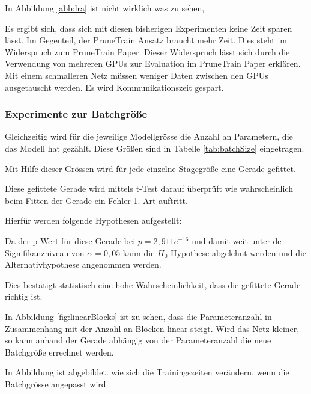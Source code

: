  In Abbildung \ref{abb:lra} ist nicht wirklich was zu sehen, 
 
 
 
Es ergibt sich, dass sich mit diesen bisherigen Experimenten keine Zeit sparen lässt. Im Gegenteil, der PruneTrain Ansatz braucht mehr Zeit. Dies steht im Widerspruch zum PruneTrain Paper. Dieser Widerspruch lässt sich durch die Verwendung von mehreren GPUs zur Evaluation im PruneTrain Paper erklären. Mit einem schmalleren Netz müssen weniger Daten zwischen den GPUs ausgetauscht werden. Es wird Kommunikationszeit gespart.




\color{blue1}

\subsubsection{Experimente zur Batchgröße}



Gleichzeitig wird für die jeweilige Modellgrösse die Anzahl an Parametern, die das Modell hat gezählt. Diese Größen sind in Tabelle \ref{tab:batchSize} eingetragen. 


Mit Hilfe dieser Grössen wird für jede einzelne Stagegröße eine Gerade gefittet.

Diese gefittete Gerade wird mittels t-Test darauf überprüft wie wahrscheinlich beim Fitten der Gerade ein Fehler 1. Art auftritt.

Hierfür werden folgende Hypothesen aufgestellt:


Da der p-Wert für diese Gerade bei $p=2,911e^{-16}$ und damit weit unter de Signifikanzniveau von $\alpha=0,05$ kann die $H_0$ Hypothese abgelehnt werden und die Alternativhypothese angenommen werden.

Dies bestätigt statistisch eine hohe Wahrscheinlichkeit, dass die gefittete Gerade richtig ist.



In Abbildung \ref{fig:linearBlocks} ist zu sehen, dass die Parameteranzahl in Zusammenhang mit der Anzahl an Blöcken linear steigt.
Wird das Netz kleiner, so kann anhand der Gerade abhängig von der Parameteranzahl die neue Batchgröße errechnet werden.







In Abbildung  ist abgebildet. wie sich die Trainingszeiten verändern, wenn die Batchgrösse angepasst wird.



